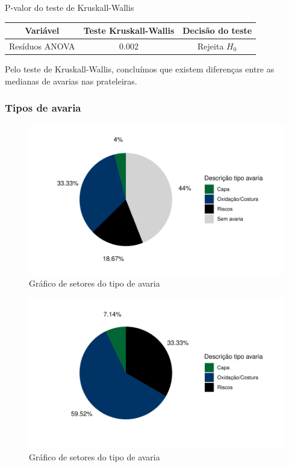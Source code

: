 \documentclass[a4paper, 12pt]{article}
\begin{document}
\begin{quadro}[H]
\centering
\caption{P-valor do teste de Kruskall-Wallis}
\begin{tabular}{|c|c|c|}
\hline
\textbf{Variável} & \textbf{Teste Kruskall-Wallis} & \textbf{Decisão do teste} \\ \hline Resíduos ANOVA
 & 0.002       & Rejeita $H_0$  \\ \hline  
\end{tabular}
\end{quadro}

Pelo teste de Kruskall-Wallis, concluímos que existem diferenças entre as medianas de avarias nas prateleiras.

\newpage

\subsubsection{Tipos de avaria}

\begin{figure}[H]
    \centering
    \caption{Gráfico de setores do tipo de avaria}
    \includegraphics[scale=1]{grafico3.pdf}
\end{figure}

\begin{figure}[H]
    \centering
    \caption{Gráfico de setores do tipo de avaria}
    \includegraphics[scale=1]{grafico4.pdf}
\end{figure}
\end{document}
